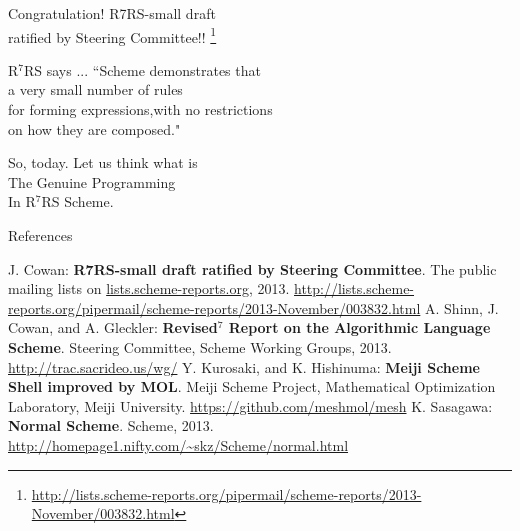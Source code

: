 \documentclass[dvipdfmx,12pt,fleqn]{beamer}
\begin{document}
\begin{frame}{Congratulation!}
\pause\Huge
R7RS-small draft\\
\alert{ratified} \Large{}by Steering Committee!!
\footnote{\url{http://lists.scheme-reports.org/pipermail/scheme-reports/2013-November/003832.html}}
\end{frame}

\begin{frame}{R$^7$RS says ...}
\Large
``Scheme demonstrates that\\
\pause \alert{a very small number of rules}\\
for forming expressions,\pause with no restrictions\\
\pause \alert{on how they are composed}."
\end{frame}

\begin{frame}{So, today.}
\huge
Let us think what is\\
\alert{The Genuine Programming}\\
In R$^7$RS Scheme.
\end{frame}


\begin{frame}{References}
\footnotesize
\begin{thebibliography}{9}
\beamertemplatetextbibitems
{} J. Cowan: \textbf{R7RS-small draft ratified by Steering Committee}. The public mailing lists on \url{lists.scheme-reports.org}, 2013. \url{http://lists.scheme-reports.org/pipermail/scheme-reports/2013-November/003832.html}
 A. Shinn, J. Cowan, and A. Gleckler: \textbf{Revised$^7$ Report on the Algorithmic Language Scheme}. Steering Committee, Scheme Working Groups, 2013. \url{http://trac.sacrideo.us/wg/}
 Y. Kurosaki, and K. Hishinuma: \textbf{Meiji Scheme Shell improved by MOL}. Meiji Scheme Project, Mathematical Optimization Laboratory, Meiji University. \url{https://github.com/meshmol/mesh}
 K. Sasagawa: \textbf{Normal Scheme}. Scheme, 2013. \url{http://homepage1.nifty.com/~skz/Scheme/normal.html}
\end{thebibliography}
\end{frame}
\end{document}
